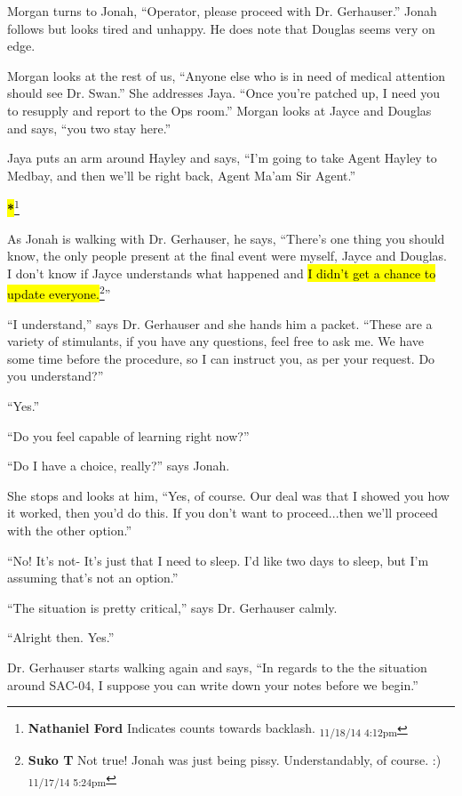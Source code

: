 Morgan turns to Jonah, ``Operator, please proceed with Dr. Gerhauser.''  Jonah follows but looks tired and unhappy.  He does note that Douglas seems very on edge.



Morgan looks at the rest of us, ``Anyone else who is in need of medical attention should see Dr. Swan.''  She addresses Jaya.  ``Once you're patched up, I need you to resupply and report to the Ops room.''  Morgan looks at Jayce and Douglas and says, ``you two stay here.''



Jaya puts an arm around Hayley and says, ``I'm going to take Agent Hayley to Medbay, and then we'll be right back, Agent Ma'am Sir Agent.''




\textbf{\hl{*}}\footnote{\textbf{Nathaniel Ford }Indicates counts towards backlash. \textsubscript{11/18/14 4:12pm}}

As Jonah is walking with Dr. Gerhauser, he says, ``There's one thing you should know, the only people present at the final event were myself, Jayce and Douglas.  I don't know if Jayce understands what happened and \hl{I didn't get a chance to update everyone.}\footnote{\textbf{Suko T }Not true!  Jonah was just being pissy.  Understandably, of course. :) \textsubscript{11/17/14 5:24pm}}''

``I understand,'' says Dr. Gerhauser and she hands him a packet.  ``These are a variety of stimulants, if you have any questions, feel free to ask me.  We have some time before the procedure, so I can instruct you, as per your request.  Do you understand?''

``Yes.''

``Do you feel capable of learning right now?''

``Do I have a choice, really?'' says Jonah.

She stops and looks at him, ``Yes, of course.  Our deal was that I showed you how it worked, then you'd do this.  If you don't want to proceed...then we'll proceed with the other option.''

``No!  It's not- It's just that I need to sleep.  I'd like two days to sleep, but I'm assuming that's not an option.''

``The situation is pretty critical,'' says Dr. Gerhauser calmly.

``Alright then.  Yes.''

Dr. Gerhauser starts walking again and says, ``In regards to the the situation around SAC-04, I suppose you can write down your notes before we begin.''

